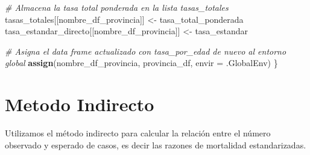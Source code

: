 \documentclass[
]{article}
\newenvironment{Shaded}{\begin{snugshade}}{\end{snugshade}}
\newcommand{\AttributeTok}[1]{\textcolor[rgb]{0.13,0.29,0.53}{#1}}
\newcommand{\CommentTok}[1]{\textcolor[rgb]{0.56,0.35,0.01}{\textit{#1}}}
\newcommand{\FunctionTok}[1]{\textcolor[rgb]{0.13,0.29,0.53}{\textbf{#1}}}
\newcommand{\NormalTok}[1]{#1}
\newcommand{\OtherTok}[1]{\textcolor[rgb]{0.56,0.35,0.01}{#1}}
\begin{document}
\begin{Shaded}
\begin{Highlighting}[]
  \CommentTok{\# Almacena la tasa total ponderada en la lista \textquotesingle{}tasas\_totales\textquotesingle{}}
\NormalTok{  tasas\_totales[[nombre\_df\_provincia]] }\OtherTok{\textless{}{-}}\NormalTok{ tasa\_total\_ponderada}
\NormalTok{  tasa\_estandar\_directo[[nombre\_df\_provincia]] }\OtherTok{\textless{}{-}}\NormalTok{ tasa\_estandar}
  
  
  \CommentTok{\# Asigna el data frame actualizado con \textquotesingle{}tasa\_por\_edad\textquotesingle{} de nuevo al entorno global}
  \FunctionTok{assign}\NormalTok{(nombre\_df\_provincia, provincia\_df, }\AttributeTok{envir =}\NormalTok{ .GlobalEnv)}
\NormalTok{\}}
\end{Highlighting}
\end{Shaded}

\section{Metodo Indirecto}\label{metodo-indirecto}

Utilizamos el método indirecto para calcular la relación entre el número
observado y esperado de casos, es decir las razones de mortalidad
estandarizadas.
\end{document}
